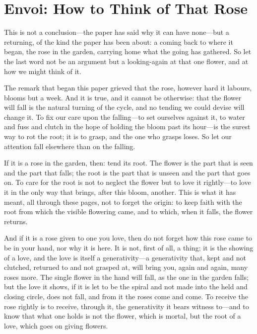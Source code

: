 \section*{Envoi: How to Think of That Rose}
\label{p09:sec:envoi}

\noindent
This is not a conclusion---the paper has said why it can have none---but a returning, of the kind the paper has been about: a coming back to where it began, the rose in the garden, carrying home what the going has gathered. So let the last word not be an argument but a looking-again at that one flower, and at how we might think of it.

The remark that began this paper grieved that the rose, however hard it labours, blooms but a week. And it is true, and it cannot be otherwise: that the flower will fall is the natural turning of the cycle, and no tending we could devise will change it. To fix our care upon the falling---to set ourselves against it, to water and fuss and clutch in the hope of holding the bloom past its hour---is the surest way to rot the root; it is to grasp, and the one who grasps loses. So let our attention fall elsewhere than on the falling. 

If it is a rose in the garden, then: tend its root. The flower is the part that is seen and the part that falls; the root is the part that is unseen and the part that goes on. To care for the root is not to neglect the flower but to love it rightly---to love it in the only way that brings, after this bloom, another. This is what it has meant, all through these pages, not to forget the origin: to keep faith with the root from which the visible flowering came, and to which, when it falls, the flower returns.

And if it is a rose given to one you love, then do not forget how this rose came to be in your hand, nor why it is here. It is not, first of all, a thing; it is the showing of a love, and the love is itself a generativity---a generativity that, kept and not clutched, returned to and not grasped at, will bring you, again and again, many roses more. The single flower in the hand will fall, as the one in the garden falls; but the love it shows, if it is let to be the spiral and not made into the held and closing circle, does not fall, and from it the roses come and come. To receive the rose rightly is to receive, through it, the generativity it bears witness to---and to know that what one holds is not the flower, which is mortal, but the root of a love, which goes on giving flowers.

